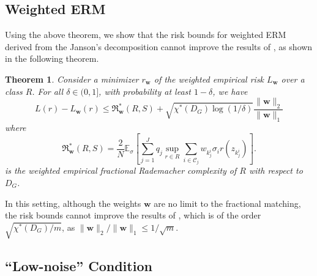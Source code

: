 \documentclass[letterpaper]{article} %
\newtheorem{theorem}{Theorem}
\newcommand{\E}{\mathbb{E}}
\newcommand{\weight}{\mathbf{w}}
\newcommand{\empiricalrisk}[1]{L_{#1}}
\newcommand{\risk}{L}
\newcommand{\rademacher}{\sigma}
\newcommand{\normo}[1]{\|#1\|_1}
\newcommand{\fcoloring}{\chi^*}
\newcommand{\rademachercomplexity}{\mathfrak{R}}
\begin{document}
\subsection{Weighted ERM} %
\label{sub:weighted_erm}

Using the above theorem, we show that the risk bounds for weighted ERM derived from the Janson's decomposition cannot improve the results of \cite{Usunier2005}, as shown in the following theorem.

\begin{theorem}
\label{th:fractional_coloring_weighted}
  Consider a minimizer $r_\weight{}$ of the weighted empirical risk $\empiricalrisk{\weight{}}$ over a class $R$. For all $\delta\in (0,1]$, with probability at least $1-\delta$, we have
  \[\risk{}(r)-\empiricalrisk{\weight{}}(r)\le \rademachercomplexity_{\weight{}}^*(R,S)+\sqrt{\fcoloring(D_G)\log(1/\delta)}\frac{\|\weight{}\|_2}{\normo{\weight{}}}\]
  where
  \[\rademachercomplexity_{\weight{}}^*(R, S) = \frac{2}{N}\E_\rademacher{}\left[\sum_{j=1}^J q_j\sup_{r\in R} \sum_{i\in \mathcal{C}_j}w_{k_j^i}\rademacher{}_i r(z_{k_j^i})\right].\]
  is the weighted empirical fractional Rademacher complexity of $R$ with respect to $D_G$.
\end{theorem}

In this setting, although the weights $\weight{}$ are no limit to the fractional matching, the risk bounds cannot improve the results of \cite{Usunier2005}, which is of the order $\sqrt{\fcoloring{}(D_G)/m}$, as $\|\weight\|_2/\normo{\weight{}}\le 1/\sqrt{m}$.

\subsection{``Low-noise'' Condition} %
\label{sub:low_noise_condition}
\end{document}
